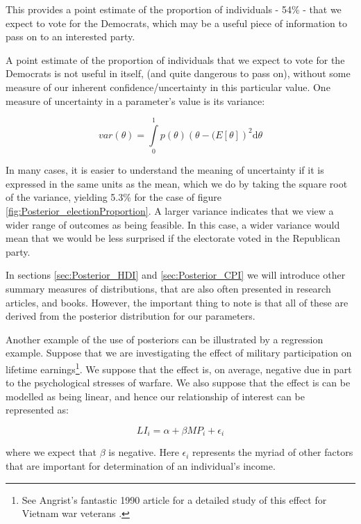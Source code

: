 \documentclass[11pt,fullpage]{book}
\begin{document}
This provides a point estimate of the proportion of individuals - 54\% - that we expect to vote for the Democrats, which may be a useful piece of information to pass on to an interested party. 

A point estimate of the proportion of individuals that we expect to vote for the Democrats is not useful in itself, (and quite dangerous to pass on), without some measure of our inherent confidence/uncertainty in this particular value. One measure of uncertainty in a parameter's value is its variance:

\begin{equation}
var(\theta)=  \int\limits_{0}^{1} p(\theta)(\theta-\mathbb(E[\theta])^2 \mathrm{d}\theta
\end{equation}

In many cases, it is easier to understand the meaning of uncertainty if it is expressed in the same units as the mean, which we do by taking the square root of the variance, yielding 5.3\% for the case of figure \ref{fig:Posterior_electionProportion}. A larger variance indicates that we view a wider range of outcomes as being feasible. In this case, a wider variance would mean that we would be less surprised if the electorate voted in the Republican party. 

In sections \ref{sec:Posterior_HDI} and \ref{sec:Posterior_CPI} we will introduce other summary measures of distributions, that are also often presented in research articles, and books. However, the important thing to note is that all of these are derived from the posterior distribution for our parameters. 

Another example of the use of posteriors can be illustrated by a regression example. Suppose that we are investigating the effect of military participation on lifetime earnings\footnote{See Angrist's fantastic 1990 article for a detailed study of this effect for Vietnam war veterans \cite{angrist1990lifetime}.}. We suppose that the effect is, on average, negative due in part to the psychological stresses of warfare. We also suppose that the effect is can be modelled as being linear, and hence our relationship of interest can be represented as:

\begin{equation}\label{eq:Posterior_militaryParticipation}
LI_i = \alpha + \beta MP_i + \epsilon_i
\end{equation}

where we expect that $\beta$ is negative. Here $\epsilon_i$ represents the myriad of other factors that are important for determination of an individual's income.
\end{document}
